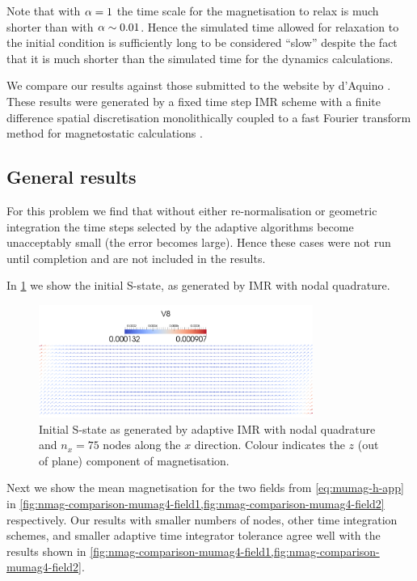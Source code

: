 Note that with $\alpha = 1$ the time scale for the magnetisation to relax is much shorter than with $\alpha \sim 0.01$.
Hence the simulated time allowed for relaxation to the initial condition is sufficiently long to be considered ``slow'' despite the fact that it is much shorter than the simulated time for the dynamics calculations.


We compare our results against those submitted to the \mumag website by d'Aquino \etal \cite{mumag-website}.
These results were generated by a fixed time step IMR scheme with a finite difference spatial discretisation monolithically coupled to a fast Fourier transform method for magnetostatic calculations \cite{DAquino2005}.



\subsection{General results}

For this problem we find that without either re-normalisation or geometric integration the time steps selected by the adaptive algorithms become unacceptably small (\ie the error becomes large).
Hence these cases were not run until completion and are not included in the results.

In \cref{fig:intial-mumag4} we show the initial S-state, as generated by IMR with nodal quadrature.
\begin{figure}
  \centering
  \includegraphics[width=0.8\textwidth]{images/mumag4-s-state.pdf}
  \caption{Initial S-state as generated by adaptive IMR with nodal quadrature and $n_x=75$ nodes along the $x$ direction.
    Colour indicates the $z$ (out of plane) component of magnetisation.
  }
  \label{fig:intial-mumag4}
\end{figure}

Next we show the mean magnetisation for the two fields from \cref{eq:mumag-h-app} in \cref{fig:nmag-comparison-mumag4-field1,fig:nmag-comparison-mumag4-field2} respectively.
Our results with smaller numbers of nodes, other time integration schemes, and smaller adaptive time integrator tolerance agree well with the results shown in \cref{fig:nmag-comparison-mumag4-field1,fig:nmag-comparison-mumag4-field2}.

